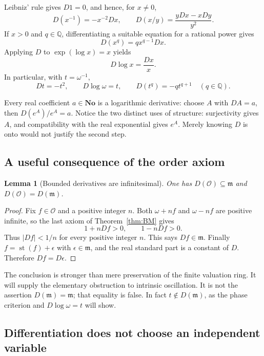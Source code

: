 \documentclass[11pt,a4paper]{article}
\numberwithin{equation}{section}
\newtheorem{lemma}[theorem]{Lemma}
\theoremstyle{definition}
\theoremstyle{remark}
\newcommand{\No}{\mathbf{No}}
\newcommand{\Q}{\mathbb Q}
\newcommand{\OO}{\mathcal O}
\newcommand{\mm}{\mathfrak m}
\newcommand{\st}{\operatorname{st}}
\newcommand{\abs}[1]{\lvert #1\rvert}
\begin{document}
Leibniz' rule gives $D1=0$, and hence, for $x\ne0$,
\begin{equation}\label{eq:quotient}
 D(x^{-1})=-x^{-2}Dx,
 \qquad
 D(x/y)=\frac{yDx-xDy}{y^2}.
\end{equation}
If $x>0$ and $q\in\Q$, differentiating a suitable equation for a rational
power gives
\begin{equation}\label{eq:rational-deriv}
 D(x^q)=q x^{q-1}Dx.
\end{equation}
Applying $D$ to $\exp(\log x)=x$ yields
\begin{equation}\label{eq:log-deriv}
 D\log x=\frac{Dx}{x}.
\end{equation}
In particular, with $t=\omega^{-1}$,
\[
 Dt=-t^2,\qquad D\log\omega=t,\qquad
 D(t^q)=-q t^{q+1}\quad(q\in\Q).
\]

Every real coefficient $a\in\No$ is a logarithmic derivative: choose $A$
with $DA=a$, then $D(e^A)/e^A=a$. Notice the two distinct uses of structure:
surjectivity gives $A$, and compatibility with the real exponential gives
$e^A$. Merely knowing $D$ is onto would not justify the second step.

\subsection{A useful consequence of the order axiom}

\begin{lemma}[Bounded derivatives are infinitesimal]\label{lem:bounded}
One has $D(\OO)\subseteq\mm$ and $D(\OO)=D(\mm)$.
\end{lemma}
\begin{proof}
Fix $f\in\OO$ and a positive integer $n$. Both $\omega+nf$ and
$\omega-nf$ are positive infinite, so the last axiom of
Theorem~\ref{thm:BM} gives
\[
 1+nDf>0,\qquad 1-nDf>0.
\]
Thus $\abs{Df}<1/n$ for every positive integer $n$. This says $Df\in\mm$.
Finally $f=\st(f)+\epsilon$ with $\epsilon\in\mm$, and the real standard
part is a constant of $D$. Therefore $Df=D\epsilon$.
\end{proof}

The conclusion is stronger than mere preservation of the finite valuation
ring. It will supply the elementary obstruction to intrinsic oscillation.
It is not the assertion $D(\mm)=\mm$; that equality is false. In fact
$t\notin D(\mm)$, as the phase criterion and $D\log\omega=t$ will show.

\subsection{Differentiation does not choose an independent variable}
\end{document}
